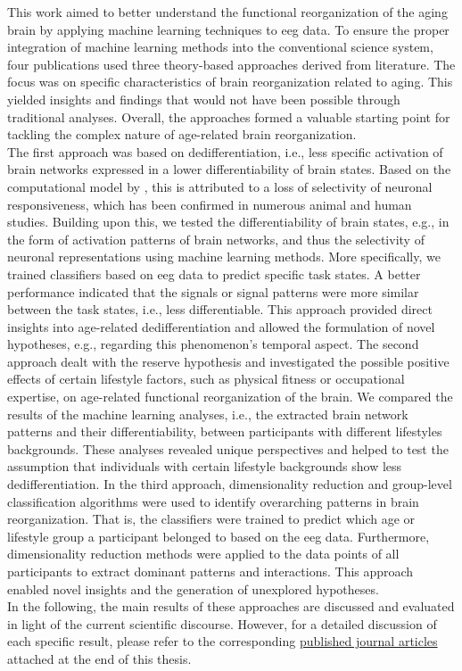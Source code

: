 This work aimed to better understand the functional reorganization of the aging brain by applying machine learning techniques to \gls{eeg} data. To ensure the proper integration of machine learning methods into the conventional science system, four publications used three theory-based approaches derived from literature. The focus was on specific characteristics of brain reorganization related to aging. This yielded insights and findings that would not have been possible through traditional analyses. Overall, the approaches formed a valuable starting point for tackling the complex nature of age-related brain reorganization.\\
The first approach was based on dedifferentiation, i.e., less specific activation of brain networks expressed in a lower differentiability of brain states. Based on the computational model by \citeauthor{Li2001} \cite{Li2001, Li2000}, this is attributed to a loss of selectivity of neuronal responsiveness, which has been confirmed in numerous animal and human studies. Building upon this, we tested the differentiability of brain states, e.g., in the form of activation patterns of brain networks, and thus the selectivity of neuronal representations using machine learning methods. More specifically, we trained classifiers based on \gls{eeg} data to predict specific task states. A better performance indicated that the signals or signal patterns were more similar between the task states, i.e., less differentiable. This approach provided direct insights into age-related dedifferentiation and allowed the formulation of novel hypotheses, e.g., regarding this phenomenon's temporal aspect. The second approach dealt with the reserve hypothesis and investigated the possible positive effects of certain lifestyle factors, such as physical fitness or occupational expertise, on age-related functional reorganization of the brain. We compared the results of the machine learning analyses, i.e., the extracted brain network patterns and their differentiability, between participants with different lifestyles backgrounds. These analyses revealed unique perspectives and helped to test the assumption that individuals with certain lifestyle backgrounds show less dedifferentiation. In the third approach, dimensionality reduction and group-level classification algorithms were used to identify overarching patterns in brain reorganization. That is, the classifiers were trained to predict which age or lifestyle group a participant belonged to based on the \gls{eeg} data. Furthermore, dimensionality reduction methods were applied to the data points of all participants to extract dominant patterns and interactions. This approach enabled novel insights and the generation of unexplored hypotheses.\\
In the following, the main results of these approaches are discussed and evaluated in light of the current scientific discourse. However, for a detailed discussion of each specific result, please refer to the corresponding \hyperref[pub:papers]{published journal articles} attached at the end of this thesis.

